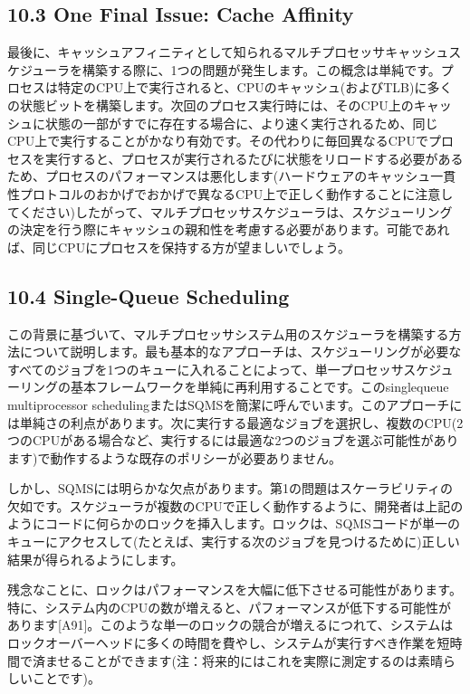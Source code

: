 \hypertarget{one-final-issue-cache-affinity}{%
\subsection*{10.3 One Final Issue: Cache
Affinity}\label{one-final-issue-cache-affinity}}

最後に、キャッシュアフィニティとして知られるマルチプロセッサキャッシュスケジューラを構築する際に、1つの問題が発生します。この概念は単純です。プロセスは特定のCPU上で実行されると、CPUのキャッシュ(およびTLB)に多くの状態ビットを構築します。次回のプロセス実行時には、そのCPU上のキャッシュに状態の一部がすでに存在する場合に、より速く実行されるため、同じCPU上で実行することがかなり有効です。その代わりに毎回異なるCPUでプロセスを実行すると、プロセスが実行されるたびに状態をリロードする必要があるため、プロセスのパフォーマンスは悪化します(ハードウェアのキャッシュ一貫性プロトコルのおかげでおかげで異なるCPU上で正しく動作することに注意してください)したがって、マルチプロセッサスケジューラは、スケジューリングの決定を行う際にキャッシュの親和性を考慮する必要があります。可能であれば、同じCPUにプロセスを保持する方が望ましいでしょう。

\hypertarget{single-queue-scheduling}{%
\subsection*{10.4 Single-Queue
Scheduling}\label{single-queue-scheduling}}

この背景に基づいて、マルチプロセッサシステム用のスケジューラを構築する方法について説明します。最も基本的なアプローチは、スケジューリングが必要なすべてのジョブを1つのキューに入れることによって、単一プロセッサスケジューリングの基本フレームワークを単純に再利用することです。このsinglequeue
multiprocessor
schedulingまたはSQMSを簡潔に呼んでいます。このアプローチには単純さの利点があります。次に実行する最適なジョブを選択し、複数のCPU(2つのCPUがある場合など、実行するには最適な2つのジョブを選ぶ可能性があります)で動作するような既存のポリシーが必要ありません。

しかし、SQMSには明らかな欠点があります。第1の問題はスケーラビリティの欠如です。スケジューラが複数のCPUで正しく動作するように、開発者は上記のようにコードに何らかのロックを挿入します。ロックは、SQMSコードが単一のキューにアクセスして(たとえば、実行する次のジョブを見つけるために)正しい結果が得られるようにします。

残念なことに、ロックはパフォーマンスを大幅に低下させる可能性があります。特に、システム内のCPUの数が増えると、パフォーマンスが低下する可能性があります{[}A91{]}。このような単一のロックの競合が増えるにつれて、システムはロックオーバーヘッドに多くの時間を費やし、システムが実行すべき作業を短時間で済ませることができます(注：将来的にはこれを実際に測定するのは素晴らしいことです)。

